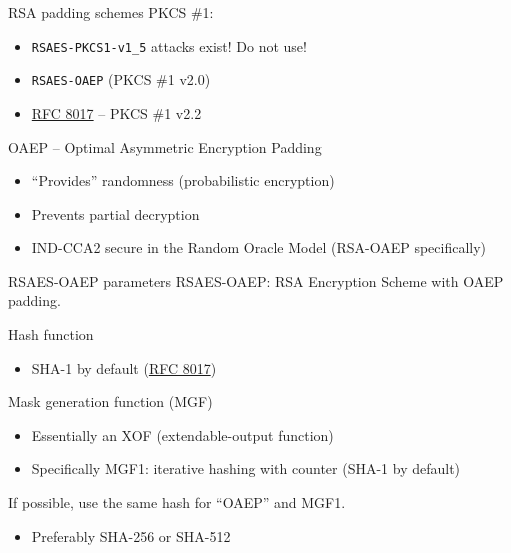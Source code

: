 \begin{frame}{RSA padding schemes}
  \pause
  PKCS \#1:
  \begin{itemize}[<+(1)->]
    \item \texttt{RSAES-PKCS1-v1\_5} attacks exist!
    Do not use!
    \item \texttt{RSAES-OAEP} (PKCS \#1 v2.0)
    \item \href{https://datatracker.ietf.org/doc/html/rfc8017}{RFC 8017} -- PKCS \#1 v2.2
  \end{itemize}

  \vspace*{1em}

  \pause
  OAEP -- Optimal Asymmetric Encryption Padding
  \begin{itemize}[<+(1)->]
    \item \enquote{Provides} randomness (probabilistic encryption)
    \item Prevents partial decryption
    \item IND-CCA2 secure in the Random Oracle Model (RSA-OAEP specifically)
  \end{itemize}
\end{frame}

\begin{frame}{RSAES-OAEP parameters}
  RSAES-OAEP: RSA Encryption Scheme with OAEP padding.

  \vspace*{0.5em}

  \pause
  Hash function
  \begin{itemize}
    \item SHA-1 by default (\href{https://datatracker.ietf.org/doc/html/rfc8017}{RFC 8017})
  \end{itemize}

  \vspace*{0.5em}

  \pause 
  Mask generation function (MGF)
  \pause
  \begin{itemize}
    \item Essentially an XOF (extendable-output function)
    \item Specifically MGF1: iterative hashing with counter (SHA-1 by default)
  \end{itemize}

  \vspace*{0.5em}

  \pause
  If possible, use the same hash for \enquote{OAEP} and MGF1.
  \begin{itemize}
    \item Preferably SHA-256 or SHA-512
  \end{itemize}
\end{frame}

